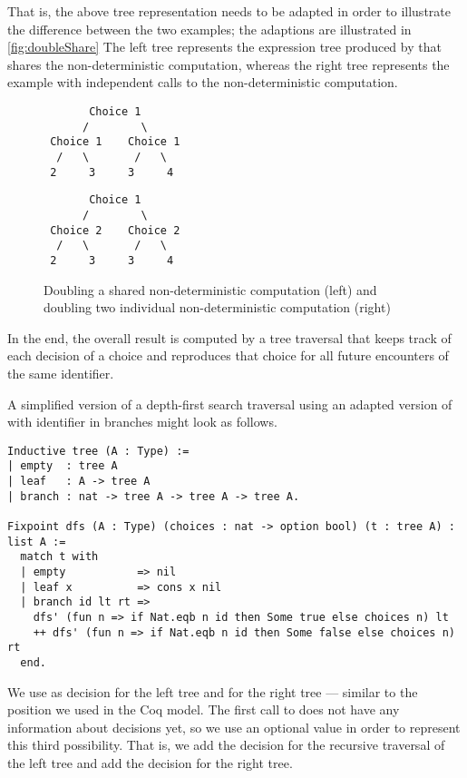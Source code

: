 That is, the above tree representation needs to be adapted in order to illustrate the difference between the two examples; the adaptions are illustrated in \autoref{fig:doubleShare}
The left tree represents the expression tree produced by  that shares the non-deterministic computation, whereas the right tree represents the example  with independent calls to the non-deterministic computation.

\begin{figure}[t]
\begin{minipage}{0.49\textwidth}
\begin{verbatim}
       Choice 1
      /        \
 Choice 1    Choice 1
  /   \       /   \
 2     3     3     4
\end{verbatim}
\end{minipage}
\begin{minipage}{0.49\textwidth}
\begin{verbatim}
       Choice 1
      /        \
 Choice 2    Choice 2
  /   \       /   \
 2     3     3     4
\end{verbatim}
\end{minipage}
\caption{Doubling a shared non-deterministic computation (left) and doubling two
  individual non-deterministic computation (right)}
\label{fig:doubleShare}
\end{figure}

In the end, the overall result is computed by a tree traversal that keeps track of each decision of a choice and reproduces that choice for all future encounters of the same identifier.

A simplified version of a depth-first search traversal using an adapted version of  with identifier in branches might look as follows.

\begin{verbatim}
Inductive tree (A : Type) :=
| empty  : tree A
| leaf   : A -> tree A
| branch : nat -> tree A -> tree A -> tree A.

Fixpoint dfs (A : Type) (choices : nat -> option bool) (t : tree A) : list A :=
  match t with
  | empty           => nil
  | leaf x          => cons x nil
  | branch id lt rt =>
    dfs' (fun n => if Nat.eqb n id then Some true else choices n) lt
    ++ dfs' (fun n => if Nat.eqb n id then Some false else choices n) rt
  end.
\end{verbatim}

We use \cinl{true} as decision for the left tree and \cinl{false} for the right tree --- similar to the position we used in the Coq model.
The first call to  does not have any information about decisions yet, so we use an optional value in order to represent this third possibility.
That is, we add the decision  for the recursive traversal of the left tree and add the decision  for the right tree.

